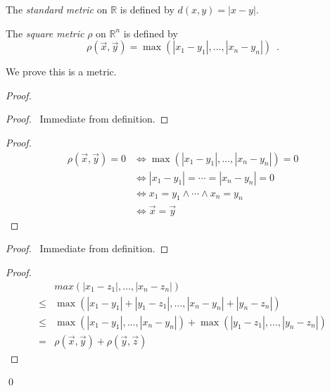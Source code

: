 \begin{df}
The \emph{standard metric} on $\mathbb{R}$ is defined by $d(x,y) = |x-y|$.
\end{df}

\begin{df}
The \emph{square metric} $\rho$ on $\mathbb{R}^n$ is defined by
\[ \rho(\vec{x}, \vec{y}) = \max(|x_1 - y_1|, \ldots, |x_n - y_n|) \enspace . \]

We prove this is a metric.
\end{df}

\begin{proof}
\pf
{}
\begin{proof}
	\pf\ Immediate from definition.
\end{proof}
\begin{proof}
	\pf
	\begin{align*}
		\rho(\vec{x}, \vec{y}) = 0 & \Leftrightarrow \max(|x_1 - y_1|, \ldots, |x_n - y_n|) = 0 \\
		& \Leftrightarrow |x_1 - y_1| = \cdots = |x_n - y_n| = 0 \\
		& \Leftrightarrow x_1 = y_1 \wedge \cdots \wedge x_n = y_n \\
		& \Leftrightarrow \vec{x} = \vec{y}
	\end{align*}
\end{proof}
\begin{proof}
	\pf\ Immediate from definition.
\end{proof}
\begin{proof}
	\pf
	\begin{align*}
		& max(|x_1 - z_1|, \ldots, |x_n - z_n|) \\
		\leq & \max(|x_1 - y_1| + |y_1 - z_1|, \ldots, |x_n - y_n| + |y_n - z_n|) \\
		\leq & \max(|x_1 - y_1|, \ldots, |x_n - y_n|) + \max(|y_1 - z_1|, \ldots, |y_n - z_n|) \\
		= & \rho(\vec{x}, \vec{y}) + \rho(\vec{y}, \vec{z})
	\end{align*}
\end{proof}
\qed
\end{proof}

